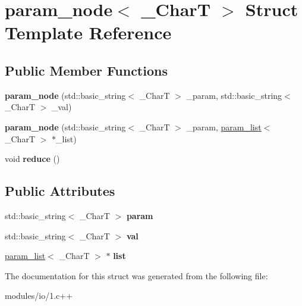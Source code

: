 \hypertarget{structparam__node}{\section{param\-\_\-node$<$ \-\_\-\-Char\-T $>$ Struct Template Reference}
\label{structparam__node}
}
\subsection*{Public Member Functions}
\begin{DoxyCompactItemize}
\item 
\hypertarget{structparam__node_a253fa6213a6fef6f3ecf8bf6f94abd16}{{\bfseries param\-\_\-node} (std\-::basic\-\_\-string$<$ \-\_\-\-Char\-T $>$ \-\_\-param, std\-::basic\-\_\-string$<$ \-\_\-\-Char\-T $>$ \-\_\-val)}\label{structparam__node_a253fa6213a6fef6f3ecf8bf6f94abd16}

\item 
\hypertarget{structparam__node_ad8dcdb3e3bd5604e79ee7a20c9c5b0f5}{{\bfseries param\-\_\-node} (std\-::basic\-\_\-string$<$ \-\_\-\-Char\-T $>$ \-\_\-param, \hyperlink{structparam__list}{param\-\_\-list}$<$ \-\_\-\-Char\-T $>$ $\ast$\-\_\-list)}\label{structparam__node_ad8dcdb3e3bd5604e79ee7a20c9c5b0f5}

\item 
\hypertarget{structparam__node_a3d1e2c5358a10906805bb1d2b8d094e5}{void {\bfseries reduce} ()}\label{structparam__node_a3d1e2c5358a10906805bb1d2b8d094e5}

\end{DoxyCompactItemize}
\subsection*{Public Attributes}
\begin{DoxyCompactItemize}
\item 
\hypertarget{structparam__node_aad18e5c8d7bac142544ac3993f6d296f}{std\-::basic\-\_\-string$<$ \-\_\-\-Char\-T $>$ {\bfseries param}}\label{structparam__node_aad18e5c8d7bac142544ac3993f6d296f}

\item 
\hypertarget{structparam__node_ac5ced2f06920976247e2606b9d27b0c1}{std\-::basic\-\_\-string$<$ \-\_\-\-Char\-T $>$ {\bfseries val}}\label{structparam__node_ac5ced2f06920976247e2606b9d27b0c1}

\item 
\hypertarget{structparam__node_ac1cdf788dd18ed31dc0457ac608e7fbf}{\hyperlink{structparam__list}{param\-\_\-list}$<$ \-\_\-\-Char\-T $>$ $\ast$ {\bfseries list}}\label{structparam__node_ac1cdf788dd18ed31dc0457ac608e7fbf}

\end{DoxyCompactItemize}


The documentation for this struct was generated from the following file\-:\begin{DoxyCompactItemize}
\item 
modules/io/1.\-c++\end{DoxyCompactItemize}
